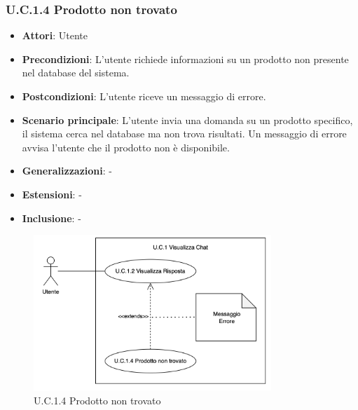\subsubsection{U.C.1.4 Prodotto non trovato}
\begin{itemize}
    \item \textbf{Attori}: Utente
    \item \textbf{Precondizioni}: L'utente richiede informazioni su un prodotto non presente nel database del sistema.
    \item \textbf{Postcondizioni}: L'utente riceve un messaggio di errore. 
    \item \textbf{Scenario principale}: L'utente invia una domanda su un prodotto specifico, il sistema cerca nel database ma non trova risultati. Un messaggio di errore avvisa l'utente che il prodotto non è disponibile.
    \item \textbf{Generalizzazioni}: -
    \item \textbf{Estensioni}: -
    \item \textbf{Inclusione}: -
\end{itemize}
\begin{figure}[H]
    \centering
    \includegraphics[width=0.8\textwidth]{img/UC1.4.png}
    \caption{U.C.1.4 Prodotto non trovato}
\end{figure}
\newpage


